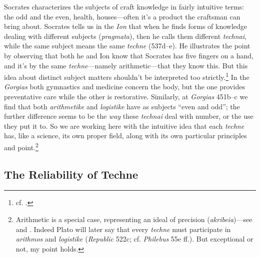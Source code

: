 ﻿\documentclass[11pt]{amsart}
\begin{document}
Socrates characterizes the subjects of craft knowledge in fairly intuitive terms: the odd and the even, health, houses---often it's a product the craftsman can bring about. Socrates tells us in the \emph{Ion} that when he finds forms of knowledge dealing with different subjects (\emph{pragmata}), then he calls them different \emph{technai}, while the same subject means the same \emph{techne} (537d--e). He illustrates the point by observing that both he and Ion know that Socrates has five fingers on a hand, and it's by the same \emph{techne}---namely arithmetic---that they know this. But this idea about distinct subject matters shouldn't be interpreted too strictly.\footnote{cf. \citet[xx]{kahn1996pas}.} In the \emph{Gorgias} both gymnastics and medicine concern the body, but the one provides preventative care while the other is restorative. Similarly, at \emph{Gorgias} 451b--c we find that both \emph{arithmetike} and \emph{logistike} have as subjects ``even and odd''; the further difference seems to be the \emph{way} these \emph{technai} deal with number, or the use they put it to. So we are working here with the intuitive idea that each \emph{techne} has, like a science, its own proper field, along with its own particular principles and point.\footnote{Arithmetic is a special case, representing an ideal of precision (\emph{akribeia})---see \citet{roochnik1994cnp, roochnik1996aaw} and \citet[13--18]{schiefsky2005}. Indeed Plato will later say that every \emph{techne} must participate in \emph{arithmos} and \emph{logistike} (\emph{Republic} 522c; cf. \emph{Philebus} 55e ff.). But exceptional or not, my point holds.}



\subsection{The Reliability of Techne}
\end{document}
